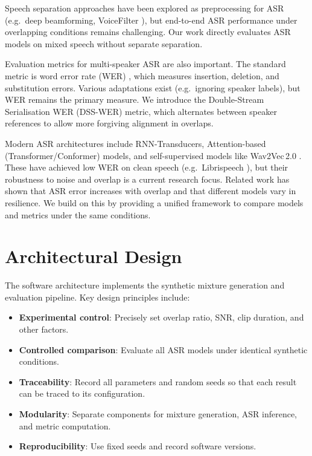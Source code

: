 \documentclass[11pt,a4paper]{report}
\begin{document}
Speech separation approaches have been explored as preprocessing for ASR (e.g.\ deep beamforming, VoiceFilter \cite{chen2020continuousspeechseparationconformer}), but end-to-end ASR performance under overlapping conditions remains challenging. Our work directly evaluates ASR models on mixed speech without separate separation.

Evaluation metrics for multi-speaker ASR are also important. The standard metric is word error rate (WER) \cite{Word_Error_Rate_Definitions}, which measures insertion, deletion, and substitution errors. Various adaptations exist (e.g.\ ignoring speaker labels), but WER remains the primary measure. We introduce the Double-Stream Serialisation WER (DSS-WER) metric, which alternates between speaker references to allow more forgiving alignment in overlaps.

Modern ASR architectures include RNN-Transducers, Attention-based (Transformer/Conformer) models, and self-supervised models like Wav2Vec\,2.0 \cite{baevski2020wav2vec20frameworkselfsupervised}. These have achieved low WER on clean speech (e.g.\ Librispeech \cite{pratap2020librispeech}), but their robustness to noise and overlap is a current research focus. Related work has shown that ASR error increases with overlap \cite{Yang2021OverlapEffect} and that different models vary in resilience. We build on this by providing a unified framework to compare models and metrics under the same conditions.

\chapter{Architectural Design}
The software architecture implements the synthetic mixture generation and evaluation pipeline. Key design principles include:
\begin{itemize}
  \item \textbf{Experimental control}: Precisely set overlap ratio, SNR, clip duration, and other factors.
  \item \textbf{Controlled comparison}: Evaluate all ASR models under identical synthetic conditions.
  \item \textbf{Traceability}: Record all parameters and random seeds so that each result can be traced to its configuration.
  \item \textbf{Modularity}: Separate components for mixture generation, ASR inference, and metric computation.
  \item \textbf{Reproducibility}: Use fixed seeds and record software versions.
\end{itemize}
\end{document}
